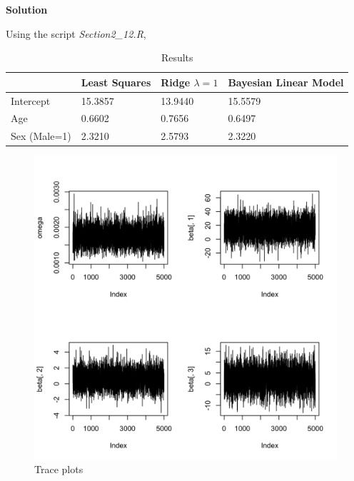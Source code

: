 \documentclass[twoside]{article}
\begin{document}
\color{blue}
\textbf{Solution}

Using the script \textit{Section2\_12.R}, 

\begin{table}[H]
	\centering
	\caption{Results}
	\label{my-label}
	\begin{tabular}{|l|l|l|l|}
		\hline
		\textbf{} & \textbf{Least Squares} & \textbf{Ridge $ \lambda = 1$} & \textbf{Bayesian Linear Model} \\ \hline
		Intercept & 15.3857                & 13.9440                     & 15.5579                        \\ \hline
		Age       & 0.6602                 & 0.7656                      & 0.6497                         \\ \hline
		Sex (Male=1)      & 2.3210                 & 2.5793                      & 2.3220                         \\ \hline
	\end{tabular}
\end{table}


\color{black}{

}

\begin{figure}[H]
	\begin{center}
		\includegraphics[width=.8\linewidth]{Section2R/Figures/P2_12_Trace.png}
		\caption{Trace plots}
	\end{center}
\end{figure}
\end{document}

